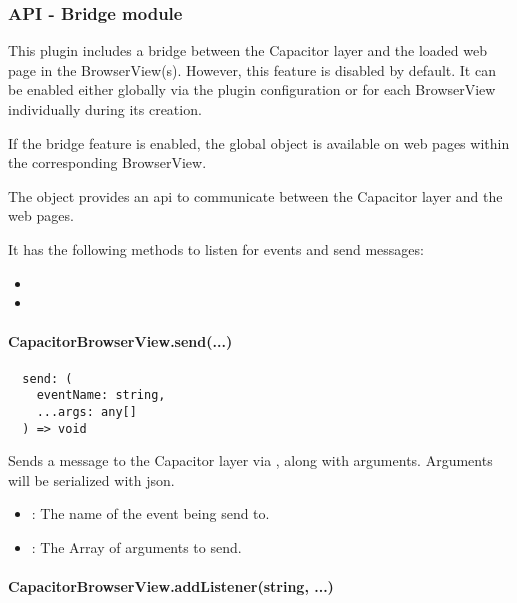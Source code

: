 \subsubsection{API - Bridge module}
\label{sec:Capacitor-BrowserView:API_BridgeModule}

This plugin includes a bridge between the Capacitor layer and the loaded web page in the BrowserView(s).
However, this feature is disabled by default. It can be enabled either globally via the plugin configuration or for each BrowserView individually during its creation.

If the bridge feature is enabled, the global object  is available on web pages within the corresponding BrowserView.

The  object provides an \ac{api} to communicate between the Capacitor layer and the web pages.

It has the following methods to listen for events and send messages:

\begin{itemize}
  \setlength\itemsep{-0.8em}
  \item {}
  \item {}
\end{itemize}


\paragraph{CapacitorBrowserView.send(...)}

\begin{verbatim}
  send: (
    eventName: string,
    ...args: any[]
  ) => void
\end{verbatim}

Sends a message to the Capacitor layer via , along with arguments.
Arguments will be serialized with \ac{json}.

\begin{itemize}
  \setlength\itemsep{-0.8em}
  \item {}: The name of the event being send to.
  \item {}: The Array of arguments to send.
\end{itemize}


\paragraph{CapacitorBrowserView.addListener(string, ...)}

